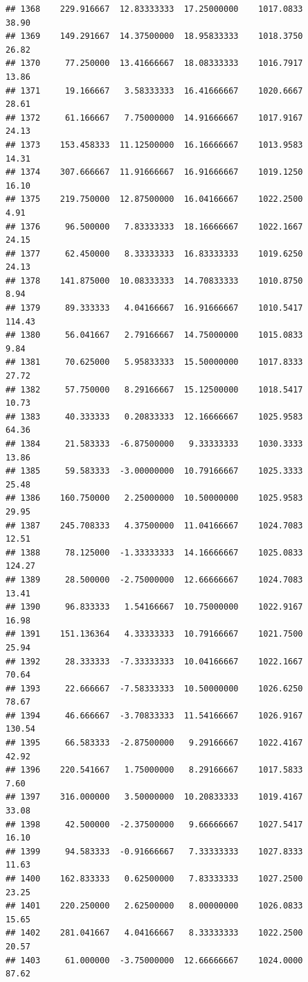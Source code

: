 \documentclass[
]{article}
\begin{document}
\begin{verbatim}
## 1368    229.916667  12.83333333  17.25000000    1017.0833       38.90
## 1369    149.291667  14.37500000  18.95833333    1018.3750       26.82
## 1370     77.250000  13.41666667  18.08333333    1016.7917       13.86
## 1371     19.166667   3.58333333  16.41666667    1020.6667       28.61
## 1372     61.166667   7.75000000  14.91666667    1017.9167       24.13
## 1373    153.458333  11.12500000  16.16666667    1013.9583       14.31
## 1374    307.666667  11.91666667  16.91666667    1019.1250       16.10
## 1375    219.750000  12.87500000  16.04166667    1022.2500        4.91
## 1376     96.500000   7.83333333  18.16666667    1022.1667       24.15
## 1377     62.450000   8.33333333  16.83333333    1019.6250       24.13
## 1378    141.875000  10.08333333  14.70833333    1010.8750        8.94
## 1379     89.333333   4.04166667  16.91666667    1010.5417      114.43
## 1380     56.041667   2.79166667  14.75000000    1015.0833        9.84
## 1381     70.625000   5.95833333  15.50000000    1017.8333       27.72
## 1382     57.750000   8.29166667  15.12500000    1018.5417       10.73
## 1383     40.333333   0.20833333  12.16666667    1025.9583       64.36
## 1384     21.583333  -6.87500000   9.33333333    1030.3333       13.86
## 1385     59.583333  -3.00000000  10.79166667    1025.3333       25.48
## 1386    160.750000   2.25000000  10.50000000    1025.9583       29.95
## 1387    245.708333   4.37500000  11.04166667    1024.7083       12.51
## 1388     78.125000  -1.33333333  14.16666667    1025.0833      124.27
## 1389     28.500000  -2.75000000  12.66666667    1024.7083       13.41
## 1390     96.833333   1.54166667  10.75000000    1022.9167       16.98
## 1391    151.136364   4.33333333  10.79166667    1021.7500       25.94
## 1392     28.333333  -7.33333333  10.04166667    1022.1667       70.64
## 1393     22.666667  -7.58333333  10.50000000    1026.6250       78.67
## 1394     46.666667  -3.70833333  11.54166667    1026.9167      130.54
## 1395     66.583333  -2.87500000   9.29166667    1022.4167       42.92
## 1396    220.541667   1.75000000   8.29166667    1017.5833        7.60
## 1397    316.000000   3.50000000  10.20833333    1019.4167       33.08
## 1398     42.500000  -2.37500000   9.66666667    1027.5417       16.10
## 1399     94.583333  -0.91666667   7.33333333    1027.8333       11.63
## 1400    162.833333   0.62500000   7.83333333    1027.2500       23.25
## 1401    220.250000   2.62500000   8.00000000    1026.0833       15.65
## 1402    281.041667   4.04166667   8.33333333    1022.2500       20.57
## 1403     61.000000  -3.75000000  12.66666667    1024.0000       87.62

\end{verbatim}
\end{document}
